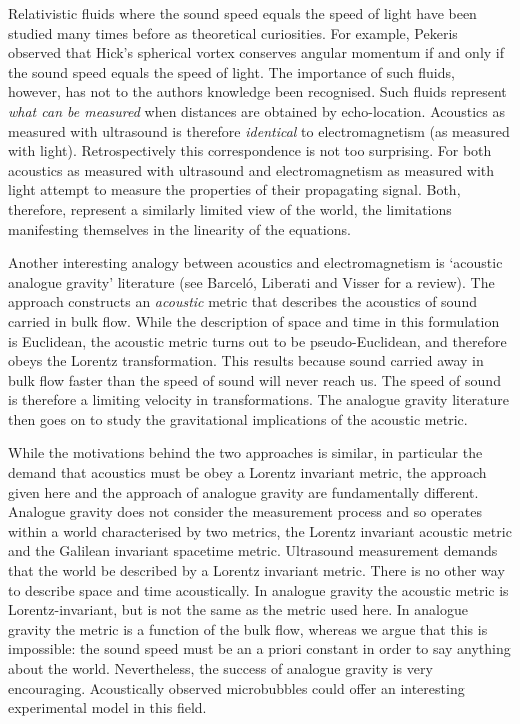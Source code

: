 \documentclass[10pt, fleqn,final,showtrims,oldfontcommands]{article} %
\begin{document}
Relativistic fluids where the sound speed equals the speed of light have been studied many times before
as theoretical curiosities\cite{Taub1978,Pekeris1977}.
For example, Pekeris observed that Hick's spherical vortex conserves angular momentum if and only if
the sound speed equals the speed of light\cite{Pekeris1977}.
The importance of such fluids, however, has not to the authors knowledge been recognised.
Such fluids represent {\em what can be measured} when distances are obtained by echo-location.
Acoustics as measured with ultrasound is therefore {\em identical} to electromagnetism (as measured with light).
Retrospectively this correspondence is not too surprising.
For both acoustics as measured with ultrasound and electromagnetism as measured with light 
attempt to measure the properties of their propagating signal.
Both, therefore, 
represent a similarly limited view of the world,
the limitations manifesting themselves in the linearity of the equations.

Another interesting analogy between acoustics and electromagnetism is `acoustic analogue gravity' literature (see Barcel{\'o}, Liberati and Visser\cite{Barcelo2005} for a review).
The approach constructs an {\em acoustic} metric that describes the acoustics of sound carried in bulk flow.
While the description of space and time in this formulation is Euclidean, the acoustic metric turns out to be pseudo-Euclidean,
and therefore obeys the Lorentz transformation.
This results because sound carried away in bulk flow  faster than the speed of sound will never reach us.
The speed of sound is  therefore a limiting velocity in transformations.
The analogue gravity literature then goes on to study the gravitational implications of the acoustic metric.

While the motivations behind the two approaches is similar, in particular the demand that acoustics must be obey a Lorentz invariant metric,
the approach given here and the approach of analogue gravity are fundamentally different.
Analogue gravity does not consider the measurement process and so operates within a world characterised by two metrics, 
the Lorentz invariant acoustic metric and the Galilean invariant spacetime  metric.
Ultrasound measurement demands that the world be described by a Lorentz invariant metric.
There is no other way to describe space and time acoustically.
In analogue gravity the acoustic metric is Lorentz-invariant, but is not the same as the metric used here.
In analogue gravity the metric is a function of the bulk flow,
whereas  we argue that this is impossible:
the sound speed must be an a priori constant in order to say anything about the world.
Nevertheless, the success of analogue gravity is very encouraging.
Acoustically observed microbubbles could offer an interesting experimental model in this field.
\end{document}
